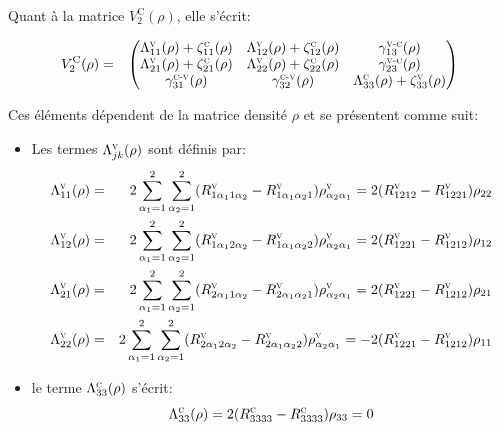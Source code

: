 \documentclass[12pt,a4paper,openany,oneside]{book}
\begin{document}
{{{{{Quant à la matrice $V_{2}^{\textrm{C}}(\rho) $, elle s'écrit:
 \renewcommand{\arraystretch}{2.2}
  {\setlength{\jot}{0.35cm}
  \begin{eqnarray*}
V_{2}^{\textrm{C}}(\rho)  
 & = & \begin{pmatrix}
\Lambda^{\textsc{v}}_{11}(\rho)+\zeta^{\textsc{c}}_{11}(\rho) & \Lambda^{\textsc{v}}_{12}(\rho)+\zeta^{\textsc{c}}_{12}(\rho)   & \gamma^{\textsc{v-c}}_{13}(\rho)\\
\Lambda^{\textsc{v}}_{21}(\rho)+\zeta^{\textsc{c}}_{21}(\rho) & \Lambda^{\textsc{v}}_{22}(\rho)+\zeta^{\textsc{c}}_{22}(\rho)   & \gamma^{\textsc{v-c}}_{23}(\rho)\\
\gamma^{\textsc{c-v}}_{31}(\rho) & \gamma^{\textsc{c-v}}_{32}(\rho) & \Lambda^{\textsc{c}}_{33}(\rho)+\zeta^{\textsc{v}}_{33}(\rho)
         \end{pmatrix}
  \end{eqnarray*}
  
Ces éléments dépendent de la matrice densité $\rho$ et se présentent comme suit:
\begin{itemize}[label=$\bullet$]
\item Les termes $ \Lambda^{\textsc{v}}_{jk}(\rho) $ sont définis par:
\begin{eqnarray*}
\Lambda^{\textsc{v}}_{11}(\rho) &=& 2\sum_{\alpha_{1}=1}^{2}\sum_{\alpha_{2}=1}^{2}(R^{\textsc{v}}_{1\alpha_{1}1\alpha_{2}}-R^{\textsc{v}}_{1\alpha_{1}\alpha_{2}1})\rho^{\textsc{v}}_{\alpha_{2}\alpha_{1}}= 2(R^{\textsc{v}}_{1212}-R^{\textsc{v}}_{1221})\rho_{22}\\ 
\Lambda^{\textsc{v}}_{12}(\rho)&=&2\sum_{\alpha_{1}=1}^{2}\sum_{\alpha_{2}=1}^{2}(R^{\textsc{v}}_{1\alpha_{1}2\alpha_{2}}-R^{\textsc{v}}_{1\alpha_{1}\alpha_{2}2})\rho^{\textsc{v}}_{\alpha_{2}\alpha_{1}}= 2(R^{\textsc{v}}_{1221}-R^{\textsc{v}}_{1212})\rho_{12}\\
\Lambda^{\textsc{v}}_{21}(\rho)&=&2\sum_{\alpha_{1}=1}^{2}\sum_{\alpha_{2}=1}^{2}(R^{\textsc{v}}_{2\alpha_{1}1\alpha_{2}}-R^{\textsc{v}}_{2\alpha_{1}\alpha_{2}1})\rho^{\textsc{v}}_{\alpha_{2}\alpha_{1}}= 2(R^{\textsc{v}}_{1221}-R^{\textsc{v}}_{1212})\rho_{21}\\
\Lambda^{\textsc{v}}_{22}(\rho) &=& 2\sum_{\alpha_{1}=1}^{2}\sum_{\alpha_{2}=1}^{2}(R^{\textsc{v}}_{2\alpha_{1}2\alpha_{2}}-R^{\textsc{v}}_{2\alpha_{1}\alpha_{2}2})\rho^{\textsc{v}}_{\alpha_{2}\alpha_{1}} =  -2(R^{\textsc{v}}_{1221}-R^{\textsc{v}}_{1212})\rho_{11}
\end{eqnarray*}
\item le terme $ \Lambda^{\textsc{c}}_{33}(\rho) $ s'écrit: 
$$ \Lambda^{\textsc{c}}_{33}(\rho) = 2(R^{\textsc{c}}_{3333}-R^{\textsc{c}}_{3333})\rho_{33}=0 $$


\end{itemize}}}}}}}
\end{document}
